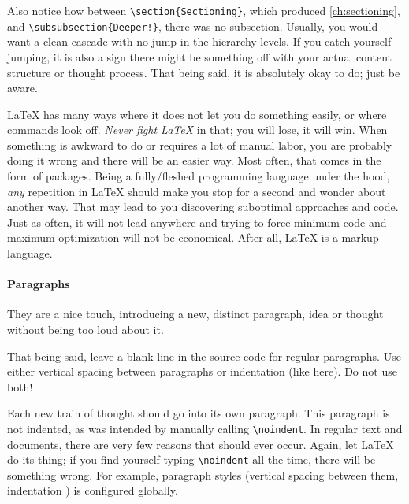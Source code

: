 Also notice how between \verb|\section{Sectioning}|, which produced \cref{ch:sectioning},
and \verb|\subsubsection{Deeper!}|, there was no subsection.
Usually, you would want a clean cascade with no jump in the hierarchy levels.
If you catch yourself jumping, it is also a sign there might be something off with your
actual content structure or thought process.
That being said, it is absolutely okay to do; just be aware.

\LaTeX{} has many ways where it does not let you do something easily, or where
commands look off.
\emph{Never fight \LaTeX{}} in that; you will lose, it will win.
When something is awkward to do or requires a lot of manual labor, you are probably
doing it wrong and there will be an easier way.
Most often, that comes in the form of packages.
Being a fully\-/fleshed programming language under the hood, \emph{any} repetition
in \LaTeX{} should make you stop for a second and wonder about another way.
That may lead to you discovering suboptimal approaches and code.
Just as often, it will not lead anywhere and trying to force minimum code and
maximum optimization will not be economical.
After all, \LaTeX{} is a markup language.

\paragraph{Paragraphs}
They are a nice touch, introducing a new, distinct paragraph, idea or thought
without being too loud about it.

That being said, leave a blank line in the source code for regular paragraphs.
Use either vertical spacing between paragraphs or indentation (like here).
Do not use both!

\noindent
Each new train of thought should go into its own paragraph.
This paragraph is not indented, as was intended by manually calling \verb|\noindent|.
In regular text and documents, there are very few reasons that should ever occur.
Again, let \LaTeX{} do its thing; if you find yourself typing \verb|\noindent|
all the time, there will be something wrong.
For example, paragraph styles (vertical spacing between them, indentation )
is configured globally.

